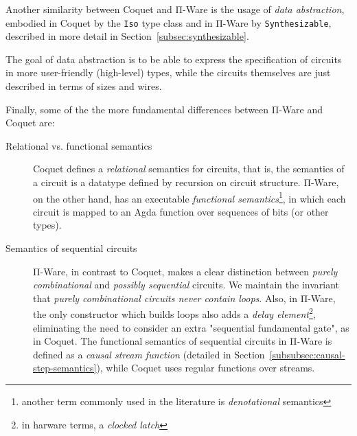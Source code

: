             Another similarity between Coquet and Π-Ware is the usage of \emph{data abstraction},
            embodied in Coquet by the \texttt{Iso} type class and in Π-Ware by \texttt{Synthesizable},
            described in more detail in Section~\ref{subsec:synthesizable}.

            The goal of data abstraction is to be able to express the specification of circuits in
            more user-friendly (high-level) types, while the circuits themselves are just described
            in terms of sizes and wires.

            Finally, some of the the more fundamental differences between Π-Ware and Coquet are:

            \begin{description}
                \item[Relational vs. functional semantics]
                    Coquet defines a \emph{relational} semantics for circuits,
                    that is, the semantics of a circuit is a datatype defined by recursion on circuit structure.
                    Π-Ware, on the other hand, has an executable
                    \emph{functional semantics}\footnote{another term commonly used in the literature is \emph{denotational} semantics},
                    in which each circuit is mapped to an Agda function over sequences of bits (or other types).
                \item[Semantics of sequential circuits]
                    Π-Ware, in contrast to Coquet, makes a clear distinction between \emph{purely combinational}
                    and \emph{possibly sequential} circuits.
                    We maintain the invariant that \emph{purely combinational circuits never contain loops}.
                    Also, in Π-Ware, the only constructor which builds loops also adds a
                    \emph{delay element}\footnote{in harware terms, a \emph{clocked latch}},
                    eliminating the need to consider an extra "sequential fundamental gate", as in Coquet.
                    The functional semantics of sequential circuits in Π-Ware is defined as a \emph{causal stream function}
                    (detailed in Section~\ref{subsubsec:causal-step-semantics}), while Coquet uses regular functions over streams.
            \end{description}

